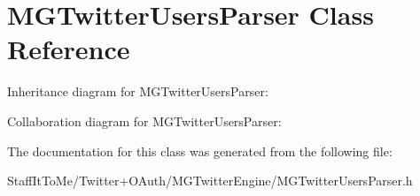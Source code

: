 \hypertarget{interface_m_g_twitter_users_parser}{
\section{\-M\-G\-Twitter\-Users\-Parser \-Class \-Reference}
\label{interface_m_g_twitter_users_parser}
}


\-Inheritance diagram for \-M\-G\-Twitter\-Users\-Parser\-:


\-Collaboration diagram for \-M\-G\-Twitter\-Users\-Parser\-:


\-The documentation for this class was generated from the following file\-:\begin{DoxyCompactItemize}
\item 
\-Staff\-It\-To\-Me/\-Twitter+\-O\-Auth/\-M\-G\-Twitter\-Engine/\-M\-G\-Twitter\-Users\-Parser.\-h\end{DoxyCompactItemize}
